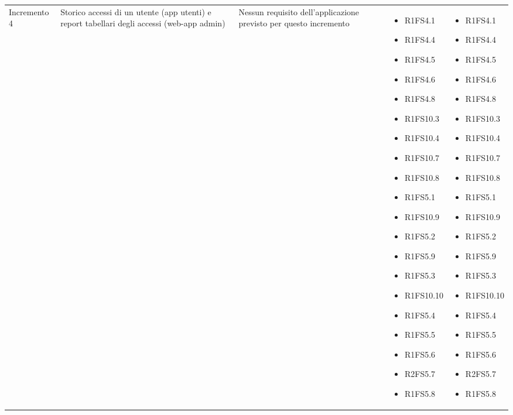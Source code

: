 {\begin{longtable}{C{2.5cm} C{3.2cm} C{2.8cm} C{2.8cm} C{2.8cm}}
Incremento 4 & Storico accessi di un utente (app utenti) e report tabellari degli accessi (web-app admin) &
    Nessun requisito dell'applicazione previsto per questo incremento
    & \begin{itemize} 
    \item[ ] R1FS4.1
    \item[ ] R1FS4.4
    \item[ ] R1FS4.5
    \item[ ] R1FS4.6
    \item[ ] R1FS4.8
    \item[ ] R1FS10.3
    \item[ ] R1FS10.4
    \item[ ] R1FS10.7
    \item[ ] R1FS10.8
    \item[ ] R1FS5.1
    \item[ ] R1FS10.9
    \item[ ] R1FS5.2
    \item[ ] R1FS5.9
    \item[ ] R1FS5.3
    \item[ ] R1FS10.10
    \item[ ] R1FS5.4
    \item[ ] R1FS5.5
    \item[ ] R1FS5.6
    \item[ ] R2FS5.7
    \item[ ] R1FS5.8
\end{itemize} & \begin{itemize} 
    \item[ ] R1FS4.1
    \item[ ] R1FS4.4
    \item[ ] R1FS4.5
    \item[ ] R1FS4.6
    \item[ ] R1FS4.8
    \item[ ] R1FS10.3
    \item[ ] R1FS10.4
    \item[ ] R1FS10.7
    \item[ ] R1FS10.8
    \item[ ] R1FS5.1
    \item[ ] R1FS10.9
    \item[ ] R1FS5.2
    \item[ ] R1FS5.9
    \item[ ] R1FS5.3
    \item[ ] R1FS10.10
    \item[ ] R1FS5.4
    \item[ ] R1FS5.5
    \item[ ] R1FS5.6
    \item[ ] R2FS5.7
    \item[ ] R1FS5.8
\end{itemize} \\


\end{longtable}}
